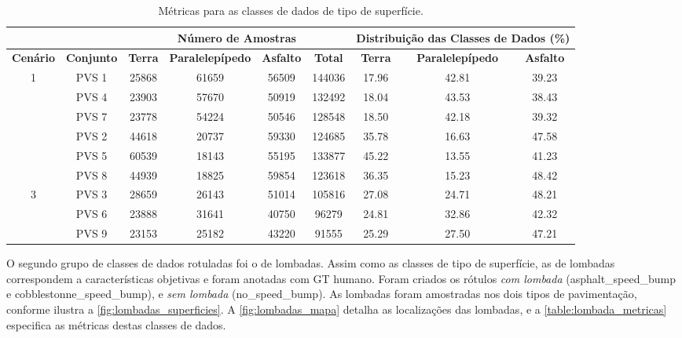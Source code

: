 \begin{table}[H]
\scriptsize
\centering
\caption{Métricas para as classes de dados de tipo de superfície.} 
\label{table:tipos_superficie_metricas}
\begin{tabular}{ccccccccc}
\cmidrule(l){3-9} & & 
\multicolumn{4}{c}{\textbf{Número de Amostras}} & 
\multicolumn{3}{c}{\textbf{Distribuição das Classes de Dados (\%)}} 
\\ \midrule

\multicolumn{1}{c}{\textbf{Cenário}} &
\textbf{Conjunto} &
\textbf{Terra} &
\textbf{Paralelepípedo} &
\textbf{Asfalto} & 
\textbf{Total} &
\textbf{Terra} &
\textbf{Paralelepípedo} &
\textbf{Asfalto}
\\ \midrule

\multicolumn{1}{c}{\multirow{4}{*}{1}} & PVS 1 & 25868 & 61659 & 56509 & 144036 & 17.96 & 42.81 & 39.23 \\ \cmidrule(l){2-9} 
\multicolumn{1}{c}{} & PVS 4 & 23903 & 57670 & 50919 & 132492 & 18.04 & 43.53 & 38.43 \\ \cmidrule(l){2-9} 
\multicolumn{1}{c}{} & PVS 7 & 23778 & 54224 & 50546 & 128548 & 18.50 & 42.18 & 39.32 \\ \midrule

\multicolumn{1}{c}{\multirow{4}{*}{2}} & PVS 2 & 44618 & 20737 & 59330 & 124685 & 35.78 & 16.63 & 47.58 \\ \cmidrule(l){2-9} 
\multicolumn{1}{c}{} & PVS 5 & 60539 & 18143 & 55195 & 133877 & 45.22 & 13.55 & 41.23 \\ \cmidrule(l){2-9} 
\multicolumn{1}{c}{} & PVS 8 & 44939 & 18825 & 59854 & 123618 & 36.35 & 15.23 & 48.42 \\ \midrule

\multicolumn{1}{c}{\multirow{4}{*}{3}} & PVS 3 & 28659 & 26143 & 51014 & 105816 & 27.08 & 24.71 & 48.21 \\ \cmidrule(l){2-9} 
\multicolumn{1}{c}{} & PVS 6 & 23888 & 31641 & 40750 & 96279 & 24.81 & 32.86 & 42.32 \\ \cmidrule(l){2-9} 
\multicolumn{1}{c}{} & PVS 9 & 23153 & 25182 & 43220 & 91555 & 25.29 & 27.50 & 47.21 \\ \bottomrule

\end{tabular}
\end{table}

O segundo grupo de classes de dados rotuladas foi o de lombadas. Assim como as classes de tipo de superfície, as de lombadas correspondem a características objetivas e foram anotadas com GT humano. Foram criados os rótulos \emph{com lombada} (asphalt\_speed\_bump e cobblestonne\_speed\_bump), e \emph{sem lombada} (no\_speed\_bump). As lombadas foram amostradas nos dois tipos de pavimentação, conforme ilustra a \autoref{fig:lombadas_superficies}. A \autoref{fig:lombadas_mapa} detalha as localizações das lombadas, e a \autoref{table:lombada_metricas} especifica as métricas destas classes de dados.

